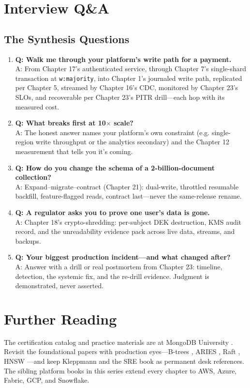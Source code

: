 \section{Interview Q\&A}
\subsection{The Synthesis Questions}
\begin{enumerate}
    \item \textbf{Q: Walk me through your platform's write path for a payment.}\\
    A: From Chapter 17's authenticated service, through Chapter 7's single-shard transaction at \texttt{w:majority}, into Chapter 1's journaled write path, replicated per Chapter 5, streamed by Chapter 16's CDC, monitored by Chapter 23's SLOs, and recoverable per Chapter 23's PITR drill---each hop with its measured cost.

    \item \textbf{Q: What breaks first at 10$\times$ scale?}\\
    A: The honest answer names your platform's own constraint (e.g. single-region write throughput or the analytics secondary) and the Chapter 12 measurement that tells you it's coming.

    \item \textbf{Q: How do you change the schema of a 2-billion-document collection?}\\
    A: Expand--migrate--contract (Chapter 21): dual-write, throttled resumable backfill, feature-flagged reads, contract last---never the same-release rename.

    \item \textbf{Q: A regulator asks you to prove one user's data is gone.}\\
    A: Chapter 18's crypto-shredding: per-subject DEK destruction, KMS audit record, and the unreadability evidence pack across live data, streams, and backups.

    \item \textbf{Q: Your biggest production incident---and what changed after?}\\
    A: Answer with a drill or real postmortem from Chapter 23: timeline, detection, the systemic fix, and the re-drill evidence. Judgment is demonstrated, never asserted.
\end{enumerate}

\section{Further Reading}
The certification catalog and practice materials are at MongoDB University \cite{mongodbUniversityDocs}. Revisit the foundational papers with production eyes---B-trees \cite{bayer1972organization}, ARIES \cite{mohan1992aries}, Raft \cite{ongaro2014raft}, HNSW \cite{malkov2020hnsw}---and keep Kleppmann \cite{kleppmann2017ddia} and the SRE book \cite{sreBook} as permanent desk references. The sibling platform books in this series extend every chapter to AWS, Azure, Fabric, GCP, and Snowflake.

